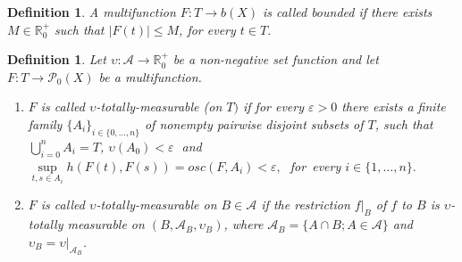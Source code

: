 \documentclass[11pt,a4paper,twoside]{amsart}
\newtheorem{definition}[theorem]{Definition}
\begin{document}
\begin{definition}\label{ex2.9} \rm 
A multifunction $F:T\rightarrow b(X)$
is called \textit{bounded} if there exists $M\in \mathbb{R}_0^{+}$
 such that 
$|F(t)|\leq M$, for every $t\in T. $
\end{definition}

\begin{definition}\label{ex2.10} \rm 
 Let $\upsilon :\mathcal{A}\rightarrow \mathbb{R}_0^+$ be a non-negative set function and let 
$F:T\rightarrow \mathcal{P}_{0}(X)$ be a multifunction.
\begin{enumerate}[\rm \ref{ex2.10}.i)]
\item $F$ is called $\upsilon $\textit{-totally-measurable} (\textit{on} $T)$
if for every $\varepsilon >0$ there exists a finite family $\{A_{i}\}_{i \in \{0, \ldots, n\}}$ 
of nonempty pairwise disjoint subsets of $T$, such that
$\bigcup\limits_{i=0}^{n}A_{i}=T$,
 $\upsilon(A_{0})<\varepsilon \;$ and
 $\sup\limits_{t,s\in A_{i}}h(F(t),F(s))=osc(F,A_{i})<\varepsilon ,\;$
for\ every $i \in \{1, \ldots, n\}.$
\item $F$ is called $\upsilon $\textit{-totally-measurable on }$B\in \mathcal{A
}$ if the restriction $f|_{B}$ of $f$ to $B$ is $\upsilon $-totally
measurable on $(B,\mathcal{A}_{B},\upsilon _{B})$, where $\mathcal{A}
_{B}=\{A\cap B;A\in \mathcal{A}\}$ and $\upsilon _{B}=\upsilon |_{\mathcal{A}
_{B}}$.
\end{enumerate}

\end{definition}
\end{document}
